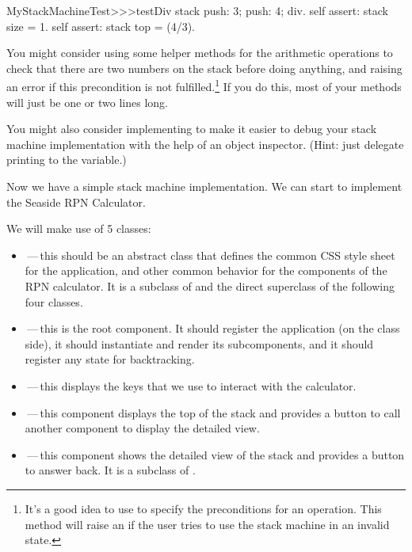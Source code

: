 \documentclass[a4paper,10pt,twoside]{book}
\begin{document}

\begin{code}{}
MyStackMachineTest>>>testDiv
	stack
		push: 3;
		push: 4;
		div.
	self assert: stack size = 1.
	self assert: stack top = (4/3).
\end{code}

You might consider using some helper methods for the arithmetic operations to check that there are two numbers on the stack before doing anything, and raising an error if this precondition is not fulfilled.\footnote{It's a good idea to use  to specify the preconditions for an operation.
This method will raise an  if the user tries to use the stack machine in an invalid state.}
If you do this, most  of your methods will just be one or two lines long.

You might also consider implementing  to make it easier to debug your stack machine implementation with the help of an object inspector.
(Hint: just delegate printing to the  variable.)


Now we have a simple stack machine implementation.
We can start to implement the Seaside RPN Calculator.

We will make use of 5 classes:
\begin{itemize}
  \item {}\,---\,this should be an abstract class that defines the common CSS style sheet for the application, and other common behavior for the components of the RPN calculator.
  It is a subclass of  and the direct superclass of the following four classes. 
  
    \item {}\,---\,this is the root component.
  It should register the application (on the class side), it should instantiate and render its subcomponents, and it should register any state for backtracking.
  \item {}\,---\,this displays the keys that we use to interact with the calculator.
  \item {}\,---\,this component displays the top of the stack and provides a button to call another component to display the detailed view.
  \item {}\,---\,this component shows the detailed view of the stack and provides a button to answer back.
  It is a subclass of .
\end{itemize}
\end{document}
